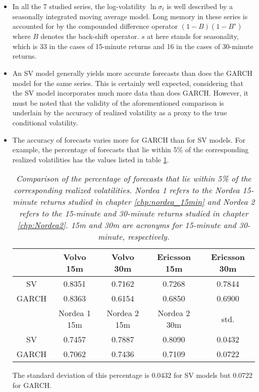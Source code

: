 \begin{itemize}
\item In all the 7 studied series, the log-volatility $\ln \sigma_t$
  is well described by a seasonally integrated moving average
  model. Long memory in these series is accounted for by the compounded
  difference operator $(1-B)(1-B^s)$ where $B$ denotes the back-shift
  operator. $s$ at here stands for seasonality, which is 33 in the
  cases of 15-minute returns and 16 in the cases of 30-minute
  returns.

\item An SV model generally yields more accurate forecasts than does
  the GARCH model for the same series. This is certainly well expected,
  considering that the SV model incorporates much more data than does
  GARCH. However, it must be noted that the validity of the
  aforementioned comparison is underlain by the accuracy of realized
  volatility as a proxy to the true conditional volatility.

\item The accuracy of forecasts varies more for GARCH than for SV
  models. For example, the percentage of forecasts
  that lie within 5\% of the corresponding realized volatilities has
  the values listed in table \ref{tab:5percent_values}.
  \begin{table}[htb!]
    \centering
    \begin{tabular}{|c|c|c|c|c|}
      \hline
      & Volvo 15m & Volvo 30m & Ericsson 15m & Ericsson 30m \\
      \hline
      SV & 0.8351 & 0.7162 & 0.7268 & 0.7844 \\
      \hline
      GARCH & 0.8363 & 0.6154 & 0.6850 & 0.6900 \\
      \hline
      \hline
      & Nordea 1 15m & Nordea 2 15m & Nordea 2 30m & std.\\
      \hline
      SV & 0.7457 & 0.7887 & 0.8090 & 0.0432 \\
      \hline
      GARCH & 0.7062 & 0.7436 & 0.7109 & 0.0722 \\
      \hline
    \end{tabular}
    \caption{\small \it Comparison of the percentage of forecasts that
      lie within 5\% of the corresponding realized
      volatilities. Nordea 1 refers to the Nordea 15-minute returns
      studied in chapter \ref{chp:nordea_15min} and Nordea 2 refers to
      the 15-minute and 30-minute returns studied in chapter
      \ref{chp:Nordea2}. 15m and 30m are acronyms for 15-minute and
      30-minute, respectively.}
    \label{tab:5percent_values}
  \end{table}
  The standard deviation of this percentage is 0.0432 for SV models
  but 0.0722 for GARCH.

\end{itemize}

